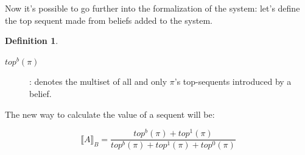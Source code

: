 \documentclass[a4paper, 12pt, oneside]{article}
\theoremstyle{plain}
\theoremstyle{definition}
\newtheorem{definition}{Definition}[section]
\begin{document}
Now it's possible to go further into the formalization of the system: let's define the top sequent made from beliefs added to the system.

\begin{definition}
	
\begin{description}
	\item[$top^b(\pi)$]: denotes the multiset of all and only $\pi$'s top-sequents introduced by a belief.
\end{description}
\noindent
The new way to calculate the value of a sequent will be:

$$\llbracket A \rrbracket_B = \frac{top^b(\pi) + top^1(\pi)}{top^b(\pi) + top^1(\pi) + top^0(\pi)}$$
	
\end{definition}
\end{document}
